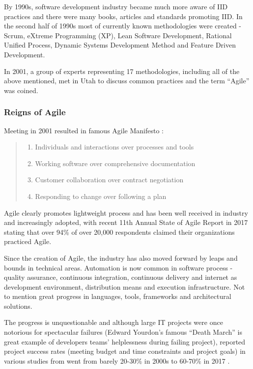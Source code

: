 \documentclass{article}
\begin{document}
By 1990s, software development industry became much more aware of IID practices and there were many books, articles and standards promoting IID. In the second half of 1990s most of currently known methodologies were created - Scrum, eXtreme Programming (XP), Lean Software Development, Rational Unified Process, Dynamic Systems Development Method and Feature Driven Development.

In 2001, a group of experts representing 17 methodologies, including all of the above mentioned, met in Utah to discuss common practices and the term ``Agile'' was coined.

\subsubsection{Reigns of Agile}

Meeting in 2001 resulted in famous Agile Manifesto \cite{beck2001agile}:
\begin{quote}
\begin{enumerate}
  \item Individuals and interactions over processes and tools
  \item Working software over comprehensive documentation
  \item Customer collaboration over contract negotiation
  \item Responding to change over following a plan
\end{enumerate}
\end{quote}

Agile clearly promotes lightweight process and has been well received in industry and increasingly adopted, with recent 11th Annual State of Agile Report in 2017 \cite{one201711th} stating that over 94\% of over 20,000 respondents claimed their organizations practiced Agile.

Since the creation of Agile, the industry has also moved forward by leaps and bounds in technical areas. Automation is now common in software process - quality assurance, continuous integration, continuous delivery and internet as development environment, distribution means and execution infrastructure. Not to mention great progress in languages, tools, frameworks and architectural solutions. \cite{fuggetta2014software}

The progress is unquestionable and although large IT projects were once notorious for spectacular failures (Edward Yourdon's famous ``Death March'' \cite{yourdon1997death} is great example of developers teams' helplessness during failing project), reported project success rates (meeting budget and time constraints and project goals) in various studies from went from barely 20-30\% in 2000s \cite{kaur2013software} to 60-70\% in 2017 \cite{pmi2017pulse}.
\end{document}
